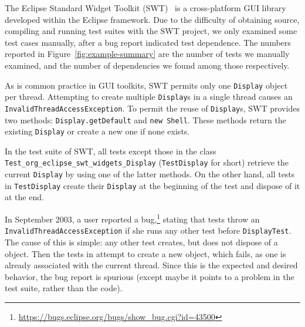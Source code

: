 \newcommand{\ite}{\texttt{Invalid\-Thread\-Access\-Exception}}

The Eclipse Standard Widget Toolkit
(SWT)~\cite{swt} is a cross-platform GUI
library developed within the Eclipse framework.
%
Due to the difficulty of obtaining source, compiling and running
test suites with the SWT project, we only examined some test cases
manually, after a bug report indicated test dependence. The
numbers reported in Figure~\ref{fig:example-summary} are the number
of tests we manually examined, and the number of dependencies we found
among those respectively.

As is common practice in GUI toolkits, SWT permits only one
\texttt{Display} object per thread. Attempting to create multiple
\texttt{Display}s in a single thread causes an \ite{}. 
To permit the reuse of \texttt{Display}s, SWT provides two 
methods: \texttt{Display.getDefault} and \texttt{new Shell}. These
methods return the existing \texttt{Display} or create a new one if none exists.


In the test suite of SWT, all tests except those in the class \texttt{Test\_org\_eclipse\_swt\_widgets\_Display}
(\texttt{TestDisplay} for short) retrieve the current \texttt{Display} by using
one of the latter methods. On the other hand, all tests in
\texttt{TestDisplay} create their \texttt{Display} at the beginning of the test
and dispose of it at the end. 



In September 2003, a user reported a
bug,\footnote{\url{https://bugs.eclipse.org/bugs/show_bug.cgi?id=43500}}
stating that tests throw an \ite{}
if she runs any other test before \texttt{DisplayTest}. 
The cause of this is simple: any other test creates, but does not
dispose of a  object. Then the tests in
 attempt to create a new object, which fails, as one
is already associated with the current thread.
Since this is the expected and desired behavior, the bug report is
spurious (except maybe it points to a problem in the test suite,
rather than the code).



